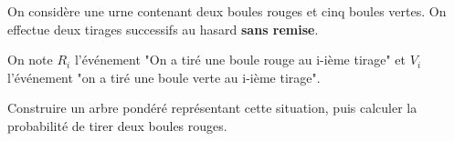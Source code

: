 \begin{exo}
	On considère une urne contenant deux boules rouges et cinq boules vertes. On effectue deux tirages successifs au hasard \textbf{sans remise}.

	On note $R_i$ l'événement "On a tiré une boule rouge au i-ième tirage" et $V_i$ l'événement "on a tiré une boule verte au i-ième tirage".
	
	Construire un arbre pondéré représentant cette situation, puis calculer la probabilité de tirer deux boules rouges.
\end{exo}
